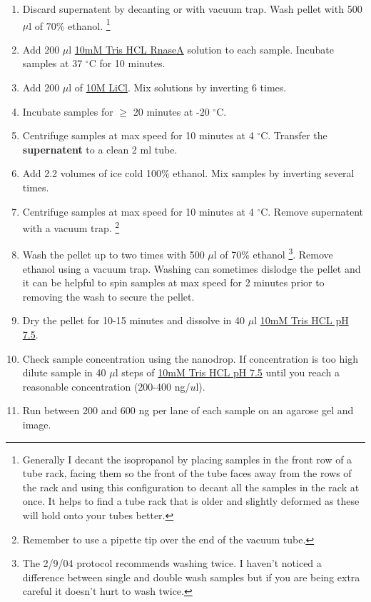 \documentclass[12pt]{article}
\theoremstyle{definition}
\begin{document}
\begin{enumerate}
	\item Discard supernatent by decanting or with vacuum trap. Wash pellet with 500 $\mu$l of 70\% ethanol. \footnote{Generally I decant the isopropanol by placing samples in the front row of a tube rack, facing them so the front of the tube faces away from the rows of the rack and using this configuration to decant all the samples in the rack at once. It helps to find a tube rack that is older and slightly deformed as these will hold onto your tubes better.}
	
	\item Add 200 $\mu$l \hyperref[sec:tris]{10mM Tris HCL RnaseA} solution to each sample. Incubate samples at 37 $^{\circ}$C for 10 minutes.
	
	\item Add 200 $\mu$l of \hyperref[sec:licl]{10M LiCl}. Mix solutions by inverting 6 times.
	
	\item Incubate samples for $ \geq$ 20 minutes at -20 $^{\circ}$C.
	
	\item  Centrifuge samples at max speed for 10 minutes at 4  $^{\circ}$C. Transfer the \textbf{supernatent} to a clean 2 ml tube.
	
	\item Add 2.2 volumes of ice cold 100\% ethanol. Mix samples by inverting several times.
	
	\item Centrifuge samples at max speed for 10 minutes at 4  $^{\circ}$C. Remove supernatent with a vacuum trap. \footnote{Remember to use a pipette tip over the end of the vacuum tube.}
	
	\item Wash the pellet up to two times with 500 $\mu$l of 70\% ethanol \footnote{The 2/9/04 protocol recommends washing twice. I haven't noticed a difference between single and double wash samples but if you are being extra careful it doesn't hurt to wash twice.}. Remove ethanol using a vacuum trap. Washing can sometimes dislodge the pellet and it can be helpful to spin samples at max speed for 2 minutes prior to removing the wash to secure the pellet.
	
	\item Dry the pellet for 10-15 minutes and dissolve in 40 $\mu$l \hyperref[sec:tris]{10mM Tris HCL pH 7.5}. 
	
	\item Check sample concentration using the nanodrop. If concentration is too high dilute sample in 40 $\mu$l steps of \hyperref[sec:tris]{10mM Tris HCL pH 7.5} until you reach a reasonable concentration (200-400 ng/$u$l).
	
	\item Run between 200 and 600 ng per lane of each sample on an agarose gel and image.
	

\end{enumerate}
\end{document}
